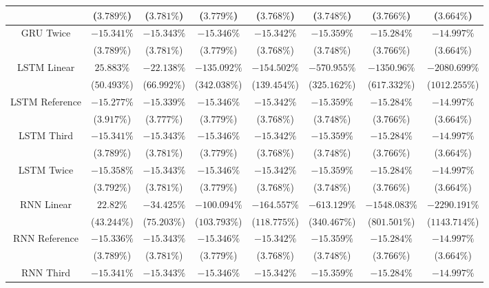 \begin{table}[!ht]
{\begin{tabular}{|c|c|c|c|c|c|c|c|}
			 & ($3.789\%$) & ($3.781\%$) & ($3.779\%$) & ($3.768\%$) & ($3.748\%$) & ($3.766\%$) & ($3.664\%$) \\ \hline
			\multirow{2}{*}{GRU Twice} & $-15.341\%$ & $-15.343\%$ & $-15.346\%$ & $-15.342\%$ & $-15.359\%$ & $-15.284\%$ & $-14.997\%$ \\
			 & ($3.789\%$) & ($3.781\%$) & ($3.779\%$) & ($3.768\%$) & ($3.748\%$) & ($3.766\%$) & ($3.664\%$) \\ \hline
			\multirow{2}{*}{LSTM Linear} & $25.883\%$ & $-22.138\%$ & $-135.092\%$ & $-154.502\%$ & $-570.955\%$ & $-1350.96\%$ & $-2080.699\%$ \\
			 & ($50.493\%$) & ($66.992\%$) & ($342.038\%$) & ($139.454\%$) & ($325.162\%$) & ($617.332\%$) & ($1012.255\%$) \\ \hline
			\multirow{2}{*}{LSTM Reference} & $-15.277\%$ & $-15.339\%$ & $-15.346\%$ & $-15.342\%$ & $-15.359\%$ & $-15.284\%$ & $-14.997\%$ \\
			 & ($3.917\%$) & ($3.777\%$) & ($3.779\%$) & ($3.768\%$) & ($3.748\%$) & ($3.766\%$) & ($3.664\%$) \\ \hline
			\multirow{2}{*}{LSTM Third} & $-15.341\%$ & $-15.343\%$ & $-15.346\%$ & $-15.342\%$ & $-15.359\%$ & $-15.284\%$ & $-14.997\%$ \\
			 & ($3.789\%$) & ($3.781\%$) & ($3.779\%$) & ($3.768\%$) & ($3.748\%$) & ($3.766\%$) & ($3.664\%$) \\ \hline
			\multirow{2}{*}{LSTM Twice} & $-15.358\%$ & $-15.343\%$ & $-15.346\%$ & $-15.342\%$ & $-15.359\%$ & $-15.284\%$ & $-14.997\%$ \\
			 & ($3.792\%$) & ($3.781\%$) & ($3.779\%$) & ($3.768\%$) & ($3.748\%$) & ($3.766\%$) & ($3.664\%$) \\ \hline
			\multirow{2}{*}{RNN Linear} & $22.82\%$ & $-34.425\%$ & $-100.094\%$ & $-164.557\%$ & $-613.129\%$ & $-1548.083\%$ & $-2290.191\%$ \\
			 & ($43.244\%$) & ($75.203\%$) & ($103.793\%$) & ($118.775\%$) & ($340.467\%$) & ($801.501\%$) & ($1143.714\%$) \\ \hline
			\multirow{2}{*}{RNN Reference} & $-15.336\%$ & $-15.343\%$ & $-15.346\%$ & $-15.342\%$ & $-15.359\%$ & $-15.284\%$ & $-14.997\%$ \\
			 & ($3.789\%$) & ($3.781\%$) & ($3.779\%$) & ($3.768\%$) & ($3.748\%$) & ($3.766\%$) & ($3.664\%$) \\ \hline
			\multirow{2}{*}{RNN Third} & $-15.341\%$ & $-15.343\%$ & $-15.346\%$ & $-15.342\%$ & $-15.359\%$ & $-15.284\%$ & $-14.997\%$ \\

\end{tabular}}
\end{table}
